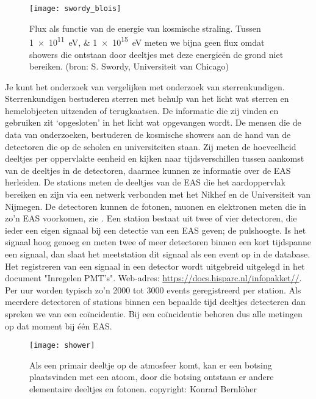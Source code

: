 \begin{figure}
    \centering
    \texttt{[image: swordy\_blois]}
    \caption{Flux als functie van de energie van kosmische straling. Tussen
             \SIlist{1e11;1e15}{\electronvolt} meten we bijna geen flux omdat
             showers die ontstaan door deeltjes met deze energieën de grond
             niet bereiken. (bron: S. Swordy, Universiteit van Chicago)}
    \label{fig:swordy_blois}
\end{figure}

Je kunt het onderzoek van \hisparc vergelijken met onderzoek van
sterrenkundigen. Sterrenkundigen bestuderen sterren met behulp van het
licht wat sterren en hemelobjecten uitzenden of terugkaatsen. De
informatie die zij vinden en gebruiken zit ‘opgesloten’ in het licht wat
opgevangen wordt. De mensen die de data van \hisparc onderzoeken,
bestuderen de kosmische showers aan de hand van de detectoren die op de
scholen en universiteiten staan. Zij meten de hoeveelheid deeltjes per
oppervlakte eenheid en kijken naar tijdsverschillen tussen aankomst van
de deeltjes in de detectoren, daarmee kunnen ze informatie over de EAS
herleiden. De \hisparc stations meten de deeltjes van de EAS die
het aardoppervlak bereiken en zijn via een netwerk verbonden met het
Nikhef en de Universiteit van Nijmegen. De \hisparc detectoren kunnen
de fotonen, muonen en elektronen meten die in zo’n EAS voorkomen, zie .
Een station bestaat uit twee of vier detectoren, die ieder
een eigen signaal bij een detectie van een EAS geven; de pulshoogte. Is
het signaal hoog genoeg en meten twee of meer detectoren binnen een kort
tijdspanne een signaal, dan slaat het meetstation dit signaal als een
event op in de database. Het registreren van een signaal in een detector wordt
uitgebreid uitgelegd in het document "Inregelen PMT's".
Web-adres: \url{https://docs.hisparc.nl/infopakket//}.
Per uur worden typisch zo’n 2000 tot 3000
events geregistreerd per station. Als meerdere detectoren of stations
binnen een bepaalde tijd deeltjes detecteren dan spreken we van een
coïncidentie. Bij een coïncidentie behoren dus alle metingen op dat
moment bij één EAS.

\begin{figure}
    \centering
    \texttt{[image: shower]}
    \caption{Als een primair deeltje op de atmosfeer komt, kan er een botsing
             plaatsvinden met een atoom, door die botsing ontstaan er andere
             elementaire deeltjes en fotonen. copyright: Konrad Bernlöher}
    \label{fig:shower}
\end{figure}


